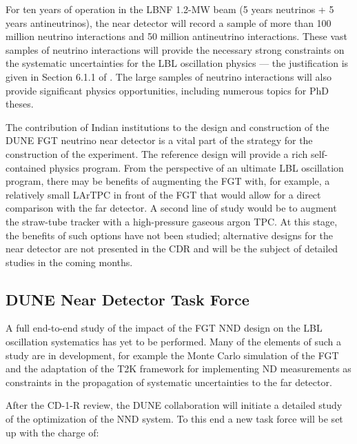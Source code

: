 For ten years of operation in the LBNF 1.2-MW beam (5 years neutrinos + 5 years 
antineutrinos), the near detector will record a sample of more than 100 million 
neutrino interactions and 50 million antineutrino interactions. These vast samples 
of neutrino interactions will provide the necessary strong constraints on the 
systematic uncertainties for the LBL oscillation physics --- the justification is 
given in Section 6.1.1 of \volphys. The large samples of neutrino 
interactions will also provide significant physics opportunities, including 
numerous topics for PhD theses.  


The contribution of Indian institutions to the design and construction of the DUNE 
FGT neutrino near detector is a vital part of the strategy for the construction 
of the experiment. The reference design will provide a rich self-contained physics 
program. From the perspective of an ultimate LBL oscillation program, there may 
be benefits of augmenting the FGT with, for example, a relatively small LArTPC 
in front of the FGT that would allow for a direct comparison with the far detector. 
A second line of study would be to augment the straw-tube tracker  with 
a high-pressure gaseous argon TPC. At this stage, the benefits of such options 
have not been studied; alternative designs for the near detector are not presented in 
the CDR and will be the subject of detailed studies in the coming months. 

\subsection{DUNE Near Detector Task Force}

A full end-to-end study of the impact of the FGT NND design on the LBL oscillation 
systematics has yet to be performed. Many of the elements of such a study are in 
development, for example the Monte Carlo simulation of the FGT and the adaptation 
of the T2K framework for implementing ND measurements as constraints in the propagation 
of systematic uncertainties to the far detector. 

After the CD-1-R review, the DUNE collaboration will initiate a detailed study 
of the optimization of the NND system. To this end a new task force will be set 
up with the charge of:

